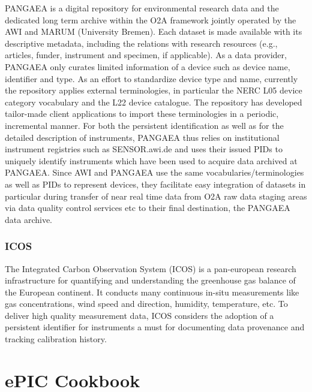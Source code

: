 \documentclass[a4paper,10pt,english]{sphinxmanual}
\begin{document}
PANGAEA is a digital repository for environmental research data and the
dedicated long term archive within the O2A framework jointly operated by
the AWI and MARUM (University Bremen). Each dataset is made available
with its descriptive metadata, including the relations with research
resources (e.g., articles, funder, instrument and specimen, if
applicable). As a data provider, PANGAEA only curates limited
information of a device such as device name, identifier and type. As an
effort to standardize device type and name, currently the repository
applies external terminologies, in particular the NERC L05 device
category vocabulary and the L22 device catalogue. The repository has
developed tailor-made client applications to import these terminologies
in a periodic, incremental manner. For both the persistent
identification as well as for the detailed description of instruments,
PANGAEA thus relies on institutional instrument registries such as
SENSOR.awi.de and uses their issued PIDs to uniquely identify
instruments which have been used to acquire data archived at PANGAEA.
Since AWI and PANGAEA use the same vocabularies/terminologies as well as
PIDs to represent devices, they facilitate easy integration of datasets
in particular during transfer of near real time data from O2A raw data
staging areas via data quality control services etc to their final
destination, the PANGAEA data archive.\sphinxfootnotemark[5]


\subsection{ICOS}
\label{\detokenize{white-paper/adoption:icos}}
The Integrated Carbon Observation System (ICOS) is a pan-european
research infrastructure for quantifying and understanding the greenhouse
gas balance of the European continent. It conducts many continuous
in-situ measurements like gas concentrations, wind speed and direction,
humidity, temperature, etc. To deliver high quality measurement data,
ICOS considers the adoption of a persistent identifier for instruments a
must for documenting data provenance and tracking calibration history.


\chapter{ePIC Cookbook}
\label{\detokenize{cookbook/index:epic-cookbook}}\label{\detokenize{cookbook/index:id1}}\label{\detokenize{cookbook/index::doc}}
\end{document}
